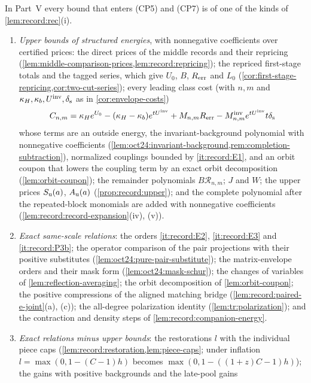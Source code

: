 \begin{remark}\label{rem:cp:robust-final}
In Part~V every bound that enters (CP5) and (CP7) is of one of the kinds of
\cref{lem:record:rec}(i).
\begin{enumerate}[label=(\alph*)]
\item\emph{Upper bounds of structured energies}, with nonnegative
 coefficients over certified prices: the direct prices of the middle records
 and their repricing (\cref{lem:middle-comparison-prices,lem:record:repricing});
 the repriced first-stage totals and the tagged series, which give $U_0$,
 $B$, $R_{\rm err}$ and $L_0$ (\cref{cor:first-stage-repricing,cor:two-cut-series});
 every leading class cost (with $n,m$ and $\kappa_H,\kappa_b,U^{\mathrm{inv}},\delta_{\rm s}$ as in \cref{cor:envelope-costs})
 \[
  C_{n,m}=\kappa_He^{U_0}-(\kappa_H-\kappa_b)e^{tU^{\mathrm{inv}}}+M_{n,m}R_{\rm err}
  -M^{\rm inv}_{n,m}e^{tU^{\mathrm{inv}}}t\delta_{\rm s}
 \]
 whose terms are an outside energy, the
 invariant-background polynomial with nonnegative coefficients
 (\cref{lem:oct24:invariant-background,rem:completion-subtraction}),
 normalized couplings bounded by \ref{it:record:E1}, and an orbit coupon that
 lowers the coupling term by an exact orbit decomposition
 (\cref{lem:orbit-coupon}); the remainder polynomials $B\mathcal R_{n,m}$; $J$
 and $W$; the upper prices $S_{\rm u}(a)$, $A_{\rm u}(a)$
 (\cref{prop:record:upper}); and the complete polynomial after the
 repeated-block monomials are added with nonnegative coefficients
 (\cref{lem:record:record-expansion}(iv), (v)).
\item\emph{Exact same-scale relations}: the orders \ref{it:record:E2},
 \ref{it:record:E3} and \ref{it:record:P3b}; the operator comparison of the
 pair projections with their positive substitutes
 (\cref{lem:oct24:pure-pair-substitute}); the matrix-envelope orders and their
 mask form (\cref{lem:oct24:mask-schur}); the changes of variables of
 \cref{lem:reflection-averaging}; the orbit decomposition of
 \cref{lem:orbit-coupon}; the positive compressions of the aligned matching
 bridge (\cref{lem:record:paired-e-joint}(a), (c)); the all-degree
 polarization identity (\cref{lem:tr:polarization}); and the contraction and
 density steps of \cref{lem:record:companion-energy}.
\item\emph{Exact relations minus upper bounds}: the restorations $l$ with the
 individual piece caps (\cref{lem:record:restoration,lem:piece-caps}; under
 inflation $l=\max(0,1-(C-1)h)$ becomes $\max(0,1-((1+z)C-1)h)$); the gains
 with positive backgrounds and the late-pool gains

\end{enumerate}
\end{remark}
